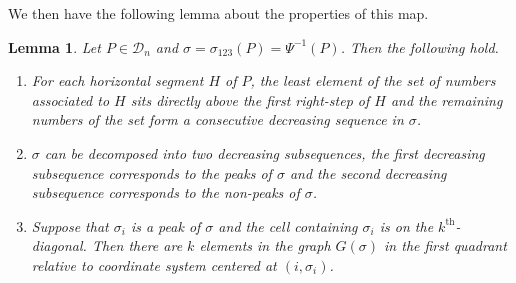\documentclass[
final,nomarks
]{dmtcs-episciences}
\newtheorem{lemma}{Lemma}
\begin{document}
We then have the following lemma about the properties of this map.
\begin{lemma}\label{p2} Let \begin{math}P \in \mathcal{D}_n\end{math} and \begin{math}\sigma = \sigma_{123}(P) = \Psi^{-1}(P)\end{math}. 
	Then the following hold. 
	\begin{enumerate}[(1)]
		\item For each horizontal segment \begin{math}H\end{math} of \begin{math}P\end{math}, the least element of the 
		set of numbers associated to \begin{math}H\end{math} sits directly above the first right-step of \begin{math}H\end{math} and 
		the remaining numbers of the set form a consecutive decreasing sequence in \begin{math}\sigma\end{math}. 
		
		\item \begin{math}\sigma\end{math} can be decomposed into two decreasing subsequences, the first decreasing 
		subsequence corresponds to the peaks of \begin{math}\sigma\end{math} and the second decreasing subsequence 
		corresponds to the non-peaks of \begin{math}\sigma\end{math}. 
		
		\item Suppose that \begin{math}\sigma_i\end{math} is a peak of \begin{math}\sigma\end{math} and the cell containing \begin{math}\sigma_i\end{math} is on the 
		\begin{math}k^{\mathrm{th}}\end{math}-diagonal. Then there are \begin{math}k\end{math} elements in the graph 
		\begin{math}G(\sigma)\end{math} in the first quadrant relative 
		to coordinate system centered at \begin{math}(i,\sigma_i)\end{math}.
	\end{enumerate}
\end{lemma}
\end{document}
